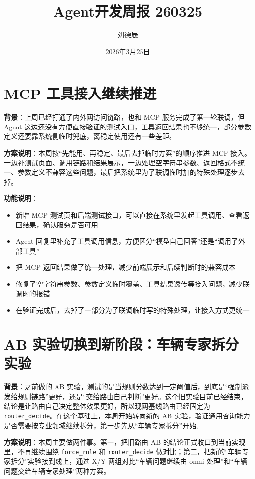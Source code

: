 \documentclass[UTF8]{ctexart}
\title{Agent开发周报 260325}
\author{刘德辰}
\date{2026年3月25日}
\begin{document}
\maketitle

\section{MCP 工具接入继续推进}

\textbf{背景}：上周已经打通了内外网访问链路，也和 MCP 服务完成了第一轮联调，但 Agent 这边还没有方便直接验证的测试入口，工具返回结果也不够统一，部分参数定义还要靠系统侧临时兜底，离稳定使用还有一些差距。

\textbf{方案说明}：本周按“先能用、再稳定、最后去掉临时方案”的顺序推进 MCP 接入。一边补测试页面、调用链路和结果展示，一边处理空字符串参数、返回格式不统一、参数定义不兼容这些问题，最后把系统里为了联调临时加的特殊处理逐步去掉。

\textbf{功能说明}：
\begin{itemize}
\item 新增 MCP 测试页和后端测试接口，可以直接在系统里发起工具调用、查看返回结果，确认服务是否可用
\item Agent 回复里补充了工具调用信息，方便区分“模型自己回答”还是“调用了外部工具”
\item 把 MCP 返回结果做了统一处理，减少前端展示和后续判断时的兼容成本
\item 修复了空字符串参数、参数定义临时覆盖、工具结果透传等接入问题，减少联调时的报错
\item 在验证完成后，去掉了一部分为了联调临时写的特殊处理，让接入方式更统一
\end{itemize}

\section{AB 实验切换到新阶段：车辆专家拆分实验}

\textbf{背景}：之前做的 AB 实验，测试的是当规则分数达到一定阈值后，到底是“强制派发给规则链路”更好，还是“交给路由自己判断”更好。这个旧实验目前已经结束，结论是让路由自己决定整体效果更好，所以现网基线路由已经固定为 \texttt{router\_decide}。在这个基础上，本周开始转向新的 AB 实验，验证通用咨询能力是否需要按专业领域继续拆分，第一步先从“车辆专家拆分”开始。

\textbf{方案说明}：本周主要做两件事。第一，把旧路由 AB 的结论正式收口到当前实现里，不再继续围绕 \texttt{force\_rule} 和 \texttt{router\_decide} 做对比；第二，把新的“车辆专家拆分”实验接到线上，通过 X/Y 两组对比“车辆问题继续由 omni 处理”和“车辆问题交给车辆专家处理”两种方案。
\end{document}
